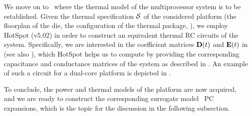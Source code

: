 We move on to \ where the thermal model of the multiprocessor system is to be established.
Given the thermal specification $\mathcal{S}$ of the considered platform (the floorplan of the die, the configuration of the thermal package, \etc), we employ HotSpot (v5.02) \cite{skadron2004} in order to construct an equivalent thermal RC circuits of the system.
Specifically, we are interested in the coefficient matrices $\mCF(\t)$ and $\mCS(\t)$ in  (see also ), which HotSpot helps us to compute by providing the corresponding capacitance and conductance matrices of the system as described in .
An example of such a circuit for a dual-core platform is depicted in .

To conclude, the power and thermal models of the platform are now acquired, and we are ready to construct the corresponding surrogate model \via\ PC expansions, which is the topic for the discussion in the following subsection.
